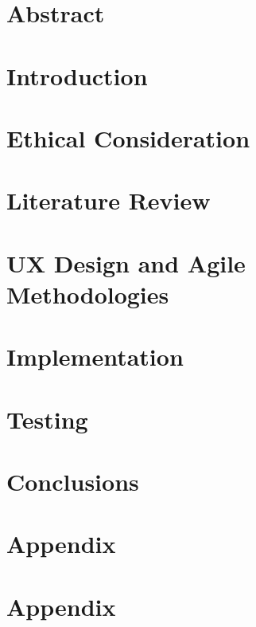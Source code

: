 \documentclass[oneside,openright,titlepage,numbers=noenddot,headinclude,footinclude=true,cleardoublepage=empty,listof=totoc,paper=a4,fontsize=11pt,english,BCOR=5mm]{scrreprt}
\begin{document}
  \frenchspacing
  \raggedbottom{}

  \pagestyle{plain}

  \singlespacing{}
  
  

  \onehalfspacing{}
  

  \chapter*{Abstract}
  

  

  \cleardoublepage{}
  \pagestyle{scrheadings}
  \onehalfspacing{}

  \chapter{Introduction}\label{c:Introduction}
  

  \chapter{Ethical Consideration}\label{c:Ethical-Consideration}
  

  \chapter{Literature Review}\label{c:Literature-Review}
  

  \chapter{UX Design and Agile Methodologies}\label{c:UX-Design-Agile-Methodologies}
  

  \chapter{Implementation}\label{c:Implementation}
  

  \chapter{Testing}\label{c:Testing}
  

  \chapter{Conclusions}\label{c:Conclusions}
  

  \cleardoublepage{}
  \appendix

  \singlespacing{}
  
  \chapter{Appendix}\label{c:Appendix-A}
  
  \chapter{Appendix}\label{c:Appendix-B}
  
  \cleardoublepage{}
\end{document}
